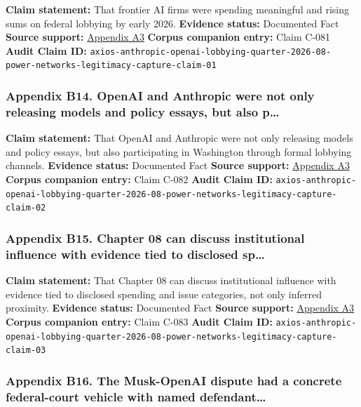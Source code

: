 \documentclass[
  american,
  11pt,
  letterpaper,
]{article}
\begin{document}
\textbf{Claim statement:} That frontier AI firms were spending
meaningful and rising sums on federal lobbying by early 2026.
\textbf{Evidence status:} Documented Fact \textbf{Source support:}
\hyperref[ch-08-appendix-a3-anthropic-outspends-openai-in-biggest-ever-lobbying-quarter]{Appendix
A3} \textbf{Corpus companion entry:} Claim C-081 \textbf{Audit Claim
ID:}
\texttt{axios-anthropic-openai-lobbying-quarter-2026-08-power-networks-legitimacy-capture-claim-01}

\subsubsection{Appendix B14. OpenAI and Anthropic were not only
releasing models and policy essays, but also
p\ldots{}}\label{ch-08-appendix-b14-openai-and-anthropic-were-not-only-releasing-models-and-policy-essays-but-also-p}

\textbf{Claim statement:} That OpenAI and Anthropic were not only
releasing models and policy essays, but also participating in Washington
through formal lobbying channels. \textbf{Evidence status:} Documented
Fact \textbf{Source support:}
\hyperref[ch-08-appendix-a3-anthropic-outspends-openai-in-biggest-ever-lobbying-quarter]{Appendix
A3} \textbf{Corpus companion entry:} Claim C-082 \textbf{Audit Claim
ID:}
\texttt{axios-anthropic-openai-lobbying-quarter-2026-08-power-networks-legitimacy-capture-claim-02}

\subsubsection{Appendix B15. Chapter 08 can discuss institutional
influence with evidence tied to disclosed
sp\ldots{}}\label{ch-08-appendix-b15-chapter-08-can-discuss-institutional-influence-with-evidence-tied-to-disclosed-sp}

\textbf{Claim statement:} That Chapter 08 can discuss institutional
influence with evidence tied to disclosed spending and issue categories,
not only inferred proximity. \textbf{Evidence status:} Documented Fact
\textbf{Source support:}
\hyperref[ch-08-appendix-a3-anthropic-outspends-openai-in-biggest-ever-lobbying-quarter]{Appendix
A3} \textbf{Corpus companion entry:} Claim C-083 \textbf{Audit Claim
ID:}
\texttt{axios-anthropic-openai-lobbying-quarter-2026-08-power-networks-legitimacy-capture-claim-03}

\subsubsection{Appendix B16. The Musk-OpenAI dispute had a concrete
federal-court vehicle with named
defendant\ldots{}}\label{ch-08-appendix-b16-the-musk-openai-dispute-had-a-concrete-federal-court-vehicle-with-named-defendant}
\end{document}
